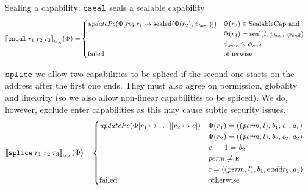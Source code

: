 \documentclass[a4paper]{article}
\newcommand{\sem}[1]{\left\llbracket #1 \right\rrbracket}
\newcommand{\tsem}[2][\Phi]{\sem{#2}_{\mathrm{trg}}(#1)}
\newcommand{\totherwise}{\text{otherwise }}
\newcommand{\targetcolor}[1]{\color{black}}
\newcommand{\trg}[1]{{\targetcolor{} #1}}
\newcommand{\zinstr}[1]{\texttt{#1}}
\newcommand{\threeinstr}[4]{
  \ifthenelse{\equal{#2#3#4}{}}
  {\zinstr{#1}}
  {\zinstr{#1} \; #2 \; #3 \; #4}
}
\newcommand{\tsplice}[3]{\threeinstr{\trg{splice}}{#1}{#2}{#3}}
\newcommand{\tcseal}[3]{\threeinstr{\trg{cseal}}{#1}{#2}{#3}}
\newcommand{\update}[2]{[#1 \mapsto #2]}
\newcommand{\shareddom}[1]{\mathrm{#1}}
\newcommand{\SealableCaps}{\shareddom{SealableCap}}
\newcommand{\perm}{\var{perm}}
\newcommand{\lin}{\var{l}}
\newcommand{\seal}[1]{\shareddom{seal}(#1)}
\newcommand{\sealed}[1]{\shareddom{sealed}(#1)}
\newcommand{\failed}{\mathrm{failed}}
\newcommand{\var}[1]{\mathit{#1}}
\newcommand{\reg}{\var{reg}}
\newcommand{\baddr}{\var{b}}
\newcommand{\eaddr}{\var{e}}
\newcommand{\aaddr}{\var{a}}
\newcommand{\plainperm}[1]{\textsc{#1}}
\newcommand{\enter}{\plainperm{e}}
\newcommand{\plainfun}[2]{
  \ifthenelse{\equal{#2}{}}
  {\mathit{#1}}
  {\mathit{#1}(#2)}
}
\newcommand{\updPcAddr}[1]{\plainfun{updatePc}{#1}}
\begin{document}
Sealing a capability: $\tcseal{}{}{}$ seals a sealable capability
\begin{align*}
  \tsem{\tcseal{r_1}{r_2}{r_3}} = & 
                                    \begin{cases}
                                      \updPcAddr{\Phi\update{\reg.r_1}{\sealed{\Phi(r_2),\phi_{\var{base}}}}} &
                                      \arraycolsep=0pt
                                      \begin{array}[t]{l}
                                        \Phi(r_2) \in \SealableCaps \text{ and } \\
                                        \Phi(r_3) = \seal{\lin,\phi_{\var{base}},\phi_{\var{end}}} \\
                                        \phi_{\var{base}} \leq \phi_{\var{end}} %
                                      \end{array} \\
                                      \failed & \text{otherwise}
                                    \end{cases}
\end{align*}

$\tsplice{}{}{}$ we allow two capabilities to be spliced if the second one starts on the address after the first one ends. They must also agree on permission, globality and linearity (so we also allow non-linear capabilities to be spliced). We do, however, exclude enter capabilities as this may cause subtle security issues.
\begin{align*}
  \tsem{\tsplice{r_1}{r_2}{r_3}} = &
                                \begin{cases}
                                  \updPcAddr{\Phi\update{r_1}{\dots}\update{r_2}{c}} &
                                  \arraycolsep=0pt
                                  \begin{array}[t]{l}
                                    \Phi(r_1) = ((\perm, \lin), \baddr_1, \eaddr_1, \aaddr_1) \\
                                    \Phi(r_2) = ((\perm, \lin), \baddr_2, \eaddr_2, \aaddr_2) \\
                                    \eaddr_1 + 1 = \baddr_2 \\
                                    \perm \neq \enter \\
                                    c = ((\perm, \lin), \baddr_1, eaddr_2, \aaddr_1)
                                  \end{array}
                                  \\
                                  \failed & \totherwise
                                \end{cases}
\end{align*}
\end{document}
